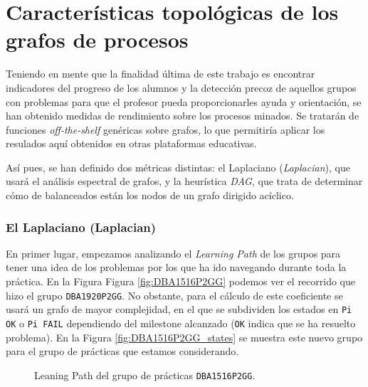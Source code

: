 \chapter{Características topológicas de los grafos de procesos}

Teniendo en mente que la finalidad última de este trabajo es encontrar indicadores del progreso de los alumnos y la detección precoz de aquellos grupos con problemas para que el profesor pueda proporcionarles ayuda y orientación, se han obtenido medidas de rendimiento sobre los procesos minados. Se tratarán de funciones \emph{off-the-shelf} genéricas sobre grafos, lo que permitiría aplicar los resulados aquí obtenidos en otras plataformas educativas.

Así pues, se han definido dos métricas distintas: el Laplaciano (\emph{Laplacian}), que usará el análisis espectral de grafos, y la heurística \emph{DAG}, que trata de determinar cómo de balanceados están los nodos de un grafo dirigido acíclico.

\subsection{El Laplaciano (Laplacian)}

En primer lugar, empezamos analizando el \emph{Learning Path} de los grupos para tener una idea de los problemas por los que ha ido navegando durante toda la práctica. En la Figura Figura \ref{fig:DBA1516P2GG} podemos ver el recorrido que hizo el grupo \texttt{DBA1920P2GG}. No obstante, para el cálculo de este coeficiente se usará un grafo de mayor complejidad, en el que se subdividen los estados en \texttt{Pi OK} o \texttt{Pi FAIL} dependiendo del milestone alcanzado (\texttt{OK} indica que se ha resuelto problema). En la Figura \ref{fig:DBA1516P2GG_states} se muestra este nuevo grupo para el grupo de prácticas que estamos considerando.

\begin{figure}[H]
\centering
{}\qquad
{}
\caption{Leaning Path del grupo de prácticas \texttt{DBA1516P2GG}.}
\label{fig:laplacian}
\end{figure}
